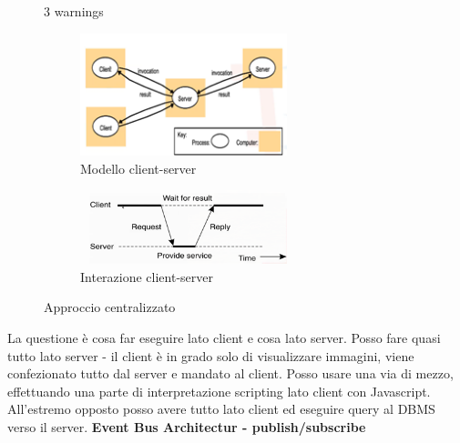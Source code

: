 \documentclass[12pt,italian]{report}
\begin{document}
\begin{figure}[h] 

3 warnings

     \centering
     \begin{subfigure}[b]{0.3\textwidth}
         \centering
         \includegraphics[width=60mm]{img/cs.png}
         \caption{Modello client-server}
     \end{subfigure}
     \hfill
     \begin{subfigure}[b]{0.5\textwidth}
         \centering
          \includegraphics[width=60mm]{img/cs2.png}
          \caption{Interazione client-server}
     \end{subfigure}
    \caption{Approccio centralizzato}
    \label{fig:acc}
\end{figure}

La questione è cosa far eseguire lato client e cosa lato server. Posso fare quasi tutto lato server - il client è in grado solo di visualizzare immagini, viene confezionato tutto dal server e mandato al client. Posso usare una via di mezzo, effettuando una parte di interpretazione scripting lato client con Javascript. All'estremo opposto posso avere tutto lato client ed eseguire query al DBMS verso il server. 
\bigbreak
\noindent \textbf{Event Bus Architectur - publish/subscribe} \\
\end{document}
